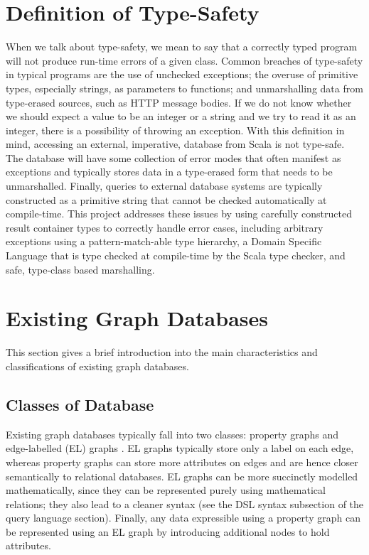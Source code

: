 \documentclass[12pt,a4paper,twoside,openright]{report}
\begin{document}
\section{Definition of Type-Safety}
When we talk about type-safety, we mean to say that a correctly typed program will not produce run-time errors of a given class. Common breaches of type-safety in typical programs are the use of unchecked exceptions; the overuse of primitive types, especially strings, as parameters to functions; and unmarshalling data from type-erased sources, such as HTTP message bodies. If we do not know whether we should expect a value to be an integer or a string and we try to read it as an integer, there is a possibility of throwing an exception. 
With this definition in mind, accessing an external, imperative, database from Scala is not type-safe. The database will have some collection of error modes that often manifest as exceptions and typically stores data in a type-erased form that needs to be unmarshalled. Finally, queries to external database systems are typically constructed as a primitive string that cannot be checked automatically at compile-time. This project addresses these issues by using carefully constructed result container types to correctly handle error cases, including arbitrary exceptions using a pattern-match-able type hierarchy, a Domain Specific Language that is type checked at compile-time by the Scala type checker, and safe, type-class based marshalling.


\section{Existing Graph Databases}
This section gives a brief introduction into the main characteristics and classifications of existing graph databases.
\subsection{Classes of Database}
Existing graph databases typically fall into two classes: property graphs and edge-labelled (EL) graphs \cite{QueryLanguageFoundations}. EL graphs typically store only a label on each edge, whereas property graphs can store more attributes on edges and are hence closer semantically to relational databases. EL graphs can be more succinctly modelled mathematically, since they can be represented purely using mathematical relations; they also lead to a cleaner syntax (see the DSL syntax subsection of the query language section). Finally, any data expressible using a property graph can be represented using an EL graph by introducing additional nodes to hold attributes.
\end{document}
